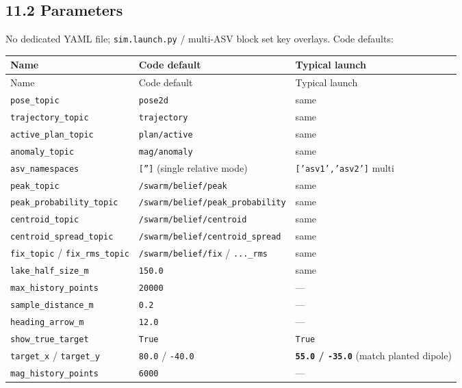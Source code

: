 \subsection{11.2 Parameters}


No dedicated YAML file; \texttt{sim.launch.py} / multi-ASV block set key overlays. Code defaults:


\begin{center}
\small
\begin{longtable}{@{}llp{7.2cm}@{}}
\toprule
Name & Code default & Typical launch \\
\midrule
\endfirsthead
\toprule
Name & Code default & Typical launch \\
\midrule
\endhead
\texttt{pose\_topic} & \texttt{pose2d} & same \\
\texttt{trajectory\_topic} & \texttt{trajectory} & same \\
\texttt{active\_plan\_topic} & \texttt{plan/active} & same \\
\texttt{anomaly\_topic} & \texttt{mag/anomaly} & same \\
\texttt{asv\_namespaces} & \texttt{['']} (single relative mode) & \texttt{['asv1','asv2']} multi \\
\texttt{peak\_topic} & \texttt{/swarm/belief/peak} & same \\
\texttt{peak\_probability\_topic} & \texttt{/swarm/belief/peak\_probability} & same \\
\texttt{centroid\_topic} & \texttt{/swarm/belief/centroid} & same \\
\texttt{centroid\_spread\_topic} & \texttt{/swarm/belief/centroid\_spread} & same \\
\texttt{fix\_topic} / \texttt{fix\_rms\_topic} & \texttt{/swarm/belief/fix} / \texttt{...\_rms} & same \\
\texttt{lake\_half\_size\_m} & \texttt{150.0} & same \\
\texttt{max\_history\_points} & \texttt{20000} & --- \\
\texttt{sample\_distance\_m} & \texttt{0.2} & --- \\
\texttt{heading\_arrow\_m} & \texttt{12.0} & --- \\
\texttt{show\_true\_target} & \texttt{True} & \texttt{True} \\
\texttt{target\_x} / \texttt{target\_y} & \texttt{80.0} / \texttt{-40.0} & \textbf{\texttt{55.0} / \texttt{-35.0}} (match planted dipole) \\
\texttt{mag\_history\_points} & \texttt{6000} & --- \\

\end{longtable}
\end{center}
